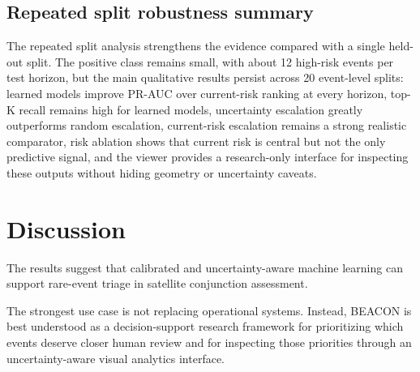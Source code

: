 \documentclass[11pt]{article}
\begin{document}
\FloatBarrier

\subsection{Repeated split robustness summary}

The repeated split analysis strengthens the evidence compared with a single held-out split. The positive class remains small, with about 12 high-risk events per test horizon, but the main qualitative results persist across 20 event-level splits: learned models improve PR-AUC over current-risk ranking at every horizon, top-K recall remains high for learned models, uncertainty escalation greatly outperforms random escalation, current-risk escalation remains a strong realistic comparator, risk ablation shows that current risk is central but not the only predictive signal, and the viewer provides a research-only interface for inspecting these outputs without hiding geometry or uncertainty caveats.

\section{Discussion}

The results suggest that calibrated and uncertainty-aware machine learning can support rare-event triage in satellite conjunction assessment.

The strongest use case is not replacing operational systems. Instead, BEACON is best understood as a decision-support research framework for prioritizing which events deserve closer human review and for inspecting those priorities through an uncertainty-aware visual analytics interface.
\end{document}
